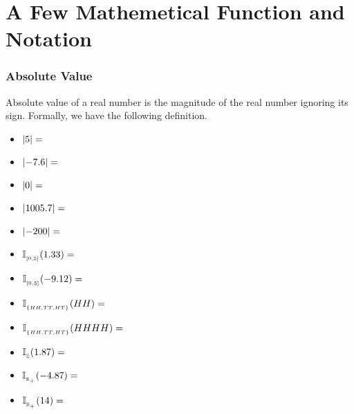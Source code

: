 \documentclass[compress]{beamer}
\begin{document}
\section{A Few Mathemetical Function and Notation}



\begin{frame}\frametitle{Absolute Value}
Absolute value of a real number is the magnitude of the real number ignoring its sign.  Formally, we have the following definition. 


\begin{itemize}
\item $\left\lvert{5}\right \rvert= $ 
\item $\left\lvert{-7.6}\right \rvert=  $
\item $\left\lvert{0}\right \rvert=  $
\item $\left\lvert{1005.7}\right \rvert=  $
\item $\left\lvert{-200}\right \rvert= $
\end{itemize}


\end{frame}



\begin{frame}


\begin{itemize}
\item $\mathbb{I}_{_{[0,5]}}({1.33 })= $ 
\item $\mathbb{I}_{_{[0,5]}}({-9.12 })=  $
\item $\mathbb{I}_{_{\{HH,TT, HT\}}}({HH })=  $
\item $\mathbb{I}_{_{\{HH,TT, HT\}}}({HHHH })=  $
\item $\mathbb{I}_{_{\mathbb{Z}}}({1.87 })=  $
\item $\mathbb{I}_{_{\mathbb{R}_{+}}}({-4.87 })=  $
\item $\mathbb{I}_{_{\mathbb{R}_{+}}}({14 })=  $
\end{itemize}
\end{frame}
\end{document}
